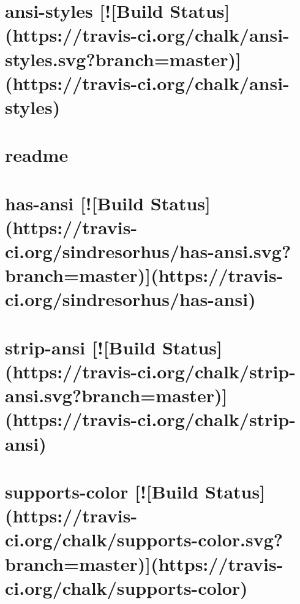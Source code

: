 \documentclass[twoside]{book}
\newcommand{\+}{\discretionary{\mbox{\scriptsize$\hookleftarrow$}}{}{}}
\begin{document}
\chapter{ansi-\/styles \mbox{[}!\mbox{[}Build Status\mbox{]}(https\+://travis-\/ci.org/chalk/ansi-\/styles.svg?branch=master)\mbox{]}(https\+://travis-\/ci.org/chalk/ansi-\/styles)}
\label{md_app_web_node_modules_maxmin_node_modules_ansi-styles_readme}

\chapter{readme}
\label{md_app_web_node_modules_maxmin_node_modules_chalk_readme}

\chapter{has-\/ansi \mbox{[}!\mbox{[}Build Status\mbox{]}(https\+://travis-\/ci.org/sindresorhus/has-\/ansi.svg?branch=master)\mbox{]}(https\+://travis-\/ci.org/sindresorhus/has-\/ansi)}
\label{md_app_web_node_modules_maxmin_node_modules_has-ansi_readme}

\chapter{strip-\/ansi \mbox{[}!\mbox{[}Build Status\mbox{]}(https\+://travis-\/ci.org/chalk/strip-\/ansi.svg?branch=master)\mbox{]}(https\+://travis-\/ci.org/chalk/strip-\/ansi)}
\label{md_app_web_node_modules_maxmin_node_modules_strip-ansi_readme}

\chapter{supports-\/color \mbox{[}!\mbox{[}Build Status\mbox{]}(https\+://travis-\/ci.org/chalk/supports-\/color.svg?branch=master)\mbox{]}(https\+://travis-\/ci.org/chalk/supports-\/color)}
\label{md_app_web_node_modules_maxmin_node_modules_supports-color_readme}

\end{document}
